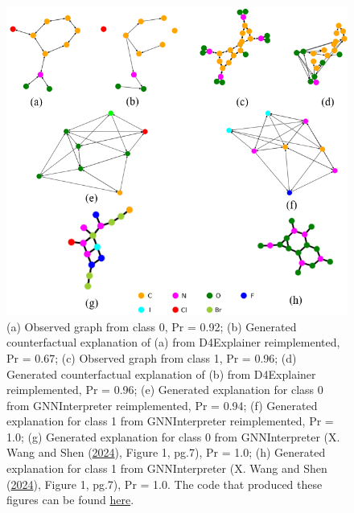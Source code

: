 \documentclass[
  11pt,
  letterpaper,
]{article}
\begin{document}
\begin{figure}

{\centering \includegraphics[width=1\textwidth,height=1\textheight]{figures/mutag_plot_together.png}

}

\caption{\label{fig-results}(a) Observed graph from class 0, Pr = 0.92;
(b) Generated counterfactual explanation of (a) from D4Explainer
reimplemented, Pr = 0.67; (c) Observed graph from class 1, Pr = 0.96;
(d) Generated counterfactual explanation of (b) from D4Explainer
reimplemented, Pr = 0.96; (e) Generated explanation for class 0 from
GNNInterpreter reimplemented, Pr = 0.94; (f) Generated explanation for
class 1 from GNNInterpreter reimplemented, Pr = 1.0; (g) Generated
explanation for class 0 from GNNInterpreter (X. Wang and Shen
(\protect\hyperlink{ref-Wang_Shen_2024}{2024}), Figure 1, pg.7), Pr =
1.0; (h) Generated explanation for class 1 from GNNInterpreter (X. Wang
and Shen (\protect\hyperlink{ref-Wang_Shen_2024}{2024}), Figure 1,
pg.7), Pr = 1.0. The code that produced these figures can be found
\href{https://github.com/Tiny-Quant/SuperTest/blob/master/coding/technical-details/main-notebook.ipynb}{here}.}

\end{figure}
\end{document}
